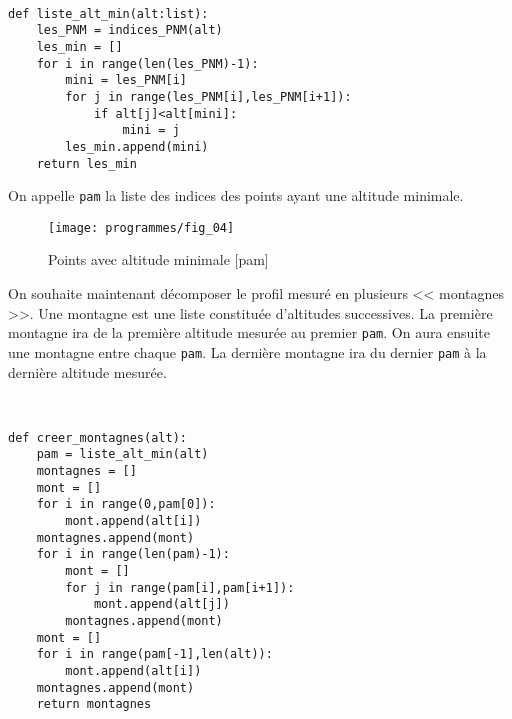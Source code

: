 \ifprof
\begin{corrige}~\\
\vspace{-.5cm}
\begin{lstlisting}
def liste_alt_min(alt:list):
    les_PNM = indices_PNM(alt)
    les_min = []
    for i in range(len(les_PNM)-1):
        mini = les_PNM[i]
        for j in range(les_PNM[i],les_PNM[i+1]):
            if alt[j]<alt[mini]:
                mini = j
        les_min.append(mini)
    return les_min
\end{lstlisting}
\end{corrige}
\else
\fi

\ifprof
\else
On appelle \texttt{pam} la liste des indices des points ayant une altitude minimale.

\begin{figure}[H]
\centering
\texttt{[image: programmes/fig\_04]}
\caption{Points avec altitude minimale [pam]}
\end{figure}

On souhaite maintenant décomposer le profil mesuré en plusieurs << montagnes >>. 
Une montagne est une liste constituée d'altitudes successives.
La première montagne ira de la première altitude mesurée au premier \texttt{pam}. 
On aura ensuite une montagne entre chaque \texttt{pam}. 
La dernière montagne ira du dernier \texttt{pam} à la dernière altitude mesurée.
\fi


\ifprof
\begin{corrige}~\\
\vspace{-.5cm}
\begin{lstlisting}
def creer_montagnes(alt):
    pam = liste_alt_min(alt)
    montagnes = []
    mont = []
    for i in range(0,pam[0]):
        mont.append(alt[i])
    montagnes.append(mont)
    for i in range(len(pam)-1):
        mont = []
        for j in range(pam[i],pam[i+1]):
            mont.append(alt[j])
        montagnes.append(mont)
    mont = []
    for i in range(pam[-1],len(alt)):
        mont.append(alt[i])
    montagnes.append(mont)
    return montagnes
\end{lstlisting}
\end{corrige}
\else
\fi


